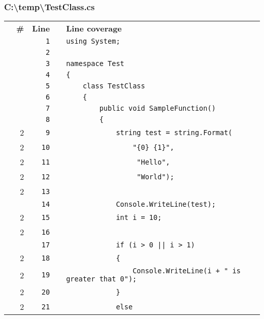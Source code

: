 \documentclass[a4paper,landscape,10pt]{article}
\begin{document}
\subsubsection{C:\textbackslash temp\textbackslash TestClass.cs}
\begin{longtable}[l]{lrrll}
\textbf{} & \textbf{\#} & \textbf{Line} & \textbf{} & \textbf{Line coverage}\\
\cellcolor{gray} &  & \verb~1~ & & \verb~using System;~\\
\cellcolor{gray} &  & \verb~2~ & & \verb~~\\
\cellcolor{gray} &  & \verb~3~ & & \verb~namespace Test~\\
\cellcolor{gray} &  & \verb~4~ & & \verb~{~\\
\cellcolor{gray} &  & \verb~5~ & & \verb~    class TestClass~\\
\cellcolor{gray} &  & \verb~6~ & & \verb~    {~\\
\cellcolor{gray} &  & \verb~7~ & & \verb~        public void SampleFunction()~\\
\cellcolor{gray} &  & \verb~8~ & & \verb~        {~\\
\cellcolor{green} & 2 & \verb~9~ & & \verb~            string test = string.Format(~\\
\cellcolor{green} & 2 & \verb~10~ & & \verb~                "{0} {1}",~\\
\cellcolor{green} & 2 & \verb~11~ & & \verb~                 "Hello",~\\
\cellcolor{green} & 2 & \verb~12~ & & \verb~                 "World");~\\
\cellcolor{green} & 2 & \verb~13~ & & \verb~~\\
\cellcolor{gray} &  & \verb~14~ & & \verb~            Console.WriteLine(test);~\\
\cellcolor{green} & 2 & \verb~15~ & & \verb~            int i = 10;~\\
\cellcolor{green} & 2 & \verb~16~ & & \verb~~\\
\cellcolor{gray} &  & \verb~17~ & & \verb~            if (i > 0 || i > 1)~\\
\cellcolor{orange} & 2 & \verb~18~ & & \verb~            {~\\
\cellcolor{green} & 2 & \verb~19~ & & \verb~                Console.WriteLine(i + " is greater that 0");~\\
\cellcolor{green} & 2 & \verb~20~ & & \verb~            }~\\
\cellcolor{green} & 2 & \verb~21~ & & \verb~            else~\\

\end{longtable}
\end{document}
